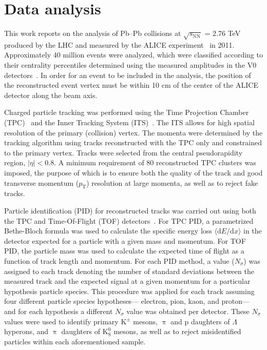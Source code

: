 \documentclass[ALICE,manyauthors]{cernphprep}
\newcommand{\pt}{$p_{\mathrm{T}}$\xspace}
\newcommand{\Lam}{$\Lambda$\xspace}
\newcommand{\Kpm}{$\mathrm{K^{\pm}}$\xspace}
\newcommand{\Ks}{$\mathrm{K^{0}_{S}}$\xspace}
\begin{document}
\section{Data analysis}
\label{sec:DataAnalysis}

This work reports on the analysis of Pb--Pb collisions at $\sqrt{s_{\mathrm{NN}}}$ = 2.76 TeV produced by the LHC and measured by the ALICE experiment~\cite{Aamodt:2008zz} in 2011.
Approximately 40 million events were analyzed, which were classified according to their centrality percentiles determined using the measured amplitudes in the V0 detectors~\cite{Abelev:2013qoq}.  
In order for an event to be included in the analysis, the position of the reconstructed event vertex must be within 10 cm of the center of the ALICE detector along the beam axis. 

Charged particle tracking was performed using the Time Projection Chamber (TPC)~\cite{2010NIMPA.622..316A} and the Inner Tracking System (ITS)~\cite{Abelevetal:2014dna}.  
The ITS allows for high spatial resolution of the primary (collision) vertex.
The momenta were determined by the tracking algorithm using tracks reconstructed with the TPC only and constrained to the primary vertex.
Tracks were selected from the central pseudorapidity region, $|\eta| < 0.8$.
A minimum requirement of 80 reconstructed TPC clusters was imposed, the purpose of which is to ensure both the quality of the track and good transverse momentum (\pt) resolution at large momenta, as well as to reject fake tracks.

Particle identification (PID) for reconstructed tracks was carried out using both the TPC and Time-Of-Flight (TOF) detectors~\cite{Abelev:2014ffa, Akindinov:2013tea}.  
For TPC PID, a parametrized Bethe-Bloch formula was used to calculate the specific energy loss $\langle \mathrm{d}E/\mathrm{d}x \rangle$ in the detector expected for a particle with a given mass and momentum.  
For TOF PID, the particle mass was used to calculate the expected time of flight as a function of track length and momentum.  
For each PID method, a value ($N_{\sigma}$) was assigned to each track denoting the number of standard deviations between the measured track and the expected signal at a given momentum for a particular hypothesis particle species.  
This procedure was applied for each track assuming four different particle species hypotheses--- electron, pion, kaon, and proton--- and for each hypothesis a different $N_{\sigma}$ value was obtained per detector.
These $N_{\sigma}$ values were used to identify primary \Kpm mesons, $\uppi$ and p daughters of \Lam hyperons, and $\uppi$ daughters of \Ks mesons, as well as to reject misidentified particles within each aforementioned sample.  
\end{document}
